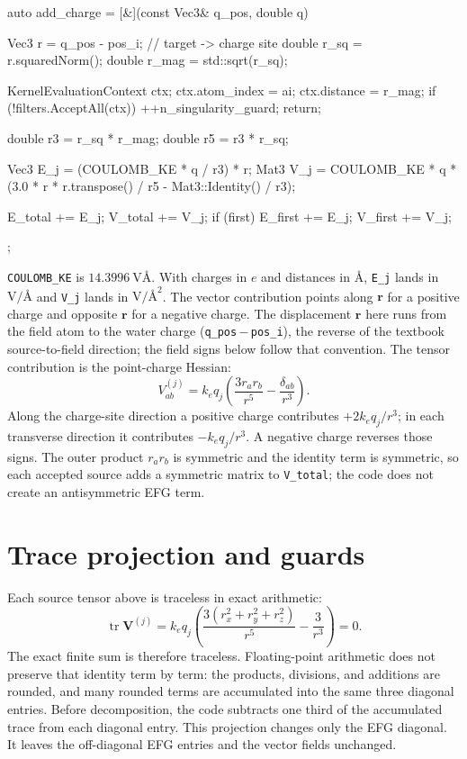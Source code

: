 \documentclass[11pt]{article}
\newcommand{\code}[1]{\texttt{#1}}
\begin{document}
\begin{codebox}
auto add_charge = [&](const Vec3& q_pos, double q) {
    Vec3 r = q_pos - pos_i;              // target -> charge site
    double r_sq = r.squaredNorm();
    double r_mag = std::sqrt(r_sq);

    KernelEvaluationContext ctx;
    ctx.atom_index = ai;
    ctx.distance = r_mag;
    if (!filters.AcceptAll(ctx)) { ++n_singularity_guard; return; }

    double r3 = r_sq * r_mag;
    double r5 = r3 * r_sq;

    Vec3 E_j = (COULOMB_KE * q / r3) * r;
    Mat3 V_j = COULOMB_KE * q *
        (3.0 * r * r.transpose() / r5 - Mat3::Identity() / r3);

    E_total += E_j;      V_total += V_j;
    if (first) { E_first += E_j; V_first += V_j; }
};
\end{codebox}

\code{COULOMB\_KE} is \(\SI{14.3996}{\volt\angstrom}\). With charges in \(e\)
and distances in \(\si{\angstrom}\), \code{E\_j} lands in
\(\si{\volt\per\angstrom}\) and \code{V\_j} lands in
\(\si{\volt\per\square\angstrom}\). The vector contribution points along
\(\bm r\) for a positive charge and opposite \(\bm r\) for a negative charge.
The displacement \(\bm r\) here runs from the field atom to the water charge
(\code{q\_pos}\,$-$\,\code{pos\_i}), the reverse of the textbook source-to-field
direction; the field signs below follow that convention.
The tensor contribution is the point-charge Hessian:
\[
  V^{(j)}_{ab} =
  k_e q_j\left(
    \frac{3 r_a r_b}{r^5} - \frac{\delta_{ab}}{r^3}
  \right).
\]
Along the charge-site direction a positive charge contributes \(+2k_eq_j/r^3\);
in each transverse direction it contributes \(-k_eq_j/r^3\). A negative charge
reverses those signs. The outer product \(r_ar_b\) is symmetric and the identity
term is symmetric, so each accepted source adds a symmetric matrix to
\code{V\_total}; the code does not create an antisymmetric EFG term.

\section{Trace projection and guards}

Each source tensor above is traceless in exact arithmetic:
\[
  \operatorname{tr}\bm V^{(j)}
  = k_e q_j\left(\frac{3(r_x^2+r_y^2+r_z^2)}{r^5}
                 -\frac{3}{r^3}\right)=0 .
\]
The exact finite sum is therefore traceless. Floating-point arithmetic
does not preserve that identity term by term: the products, divisions, and
additions are rounded, and many rounded terms are accumulated into the same
three diagonal entries. Before decomposition, the code subtracts one third of
the accumulated trace from each diagonal entry. This projection changes only
the EFG diagonal. It leaves the off-diagonal EFG entries and the vector fields
unchanged.
\end{document}
